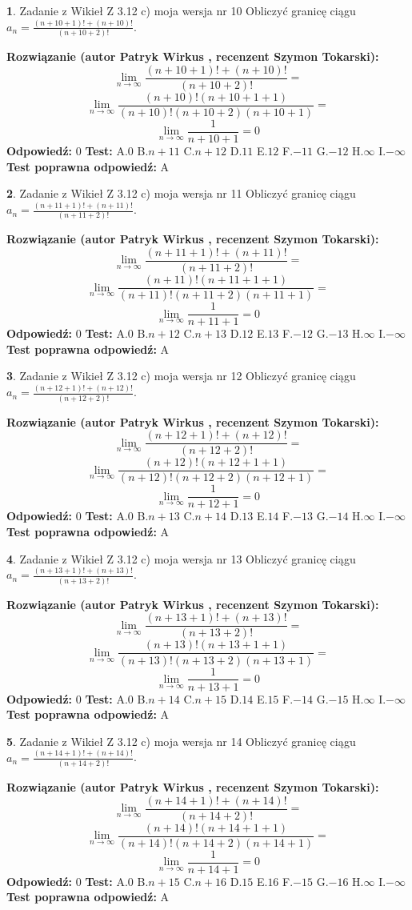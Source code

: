 \documentclass[12pt, a4paper]{article}
\theoremstyle{definition} %
\newtheorem{zad}{}
\newcommand{\zadStart}[1]{\begin{zad}#1\newline}
\newcommand{\zadStop}{\end{zad}}
\newcommand{\rozwStart}[2]{\noindent \textbf{Rozwiązanie (autor #1 , recenzent #2): }\newline}
\newcommand{\rozwStop}{\newline}
\newcommand{\odpStart}{\noindent \textbf{Odpowiedź:}\newline}
\newcommand{\odpStop}{\newline}
\newcommand{\testStart}{\noindent \textbf{Test:}\newline}
\newcommand{\testStop}{\newline}
\newcommand{\kluczStart}{\noindent \textbf{Test poprawna odpowiedź:}\newline}
\newcommand{\kluczStop}{\newline}
\begin{document}
\zadStart{Zadanie z Wikieł Z 3.12 c) moja wersja nr 10}
Obliczyć granicę ciągu $a_{n}=\frac{(n+10+1)!+(n+10)!}{(n+10+2)!}$.
\zadStop
\rozwStart{Patryk Wirkus}{Szymon Tokarski}
$$\lim\limits_{n\to\infty}\frac{(n+10+1)!+(n+10)!}{(n+10+2)!}=$$
$$\lim\limits_{n\to\infty}\frac{(n+10)!(n+10+1+1)}{(n+10)!(n+10+2)(n+10+1)}=$$
$$\lim\limits_{n\to\infty}\frac{1}{n+10+1}= 0$$
\rozwStop
\odpStart
$0$
\odpStop
\testStart
A.$0$
B.$n+11$
C.$n+12$
D.$11$
E.$12$
F.$-11$
G.$-12$
H.$\infty$
I.$-\infty$
\testStop
\kluczStart
A
\kluczStop



\zadStart{Zadanie z Wikieł Z 3.12 c) moja wersja nr 11}
Obliczyć granicę ciągu $a_{n}=\frac{(n+11+1)!+(n+11)!}{(n+11+2)!}$.
\zadStop
\rozwStart{Patryk Wirkus}{Szymon Tokarski}
$$\lim\limits_{n\to\infty}\frac{(n+11+1)!+(n+11)!}{(n+11+2)!}=$$
$$\lim\limits_{n\to\infty}\frac{(n+11)!(n+11+1+1)}{(n+11)!(n+11+2)(n+11+1)}=$$
$$\lim\limits_{n\to\infty}\frac{1}{n+11+1}= 0$$
\rozwStop
\odpStart
$0$
\odpStop
\testStart
A.$0$
B.$n+12$
C.$n+13$
D.$12$
E.$13$
F.$-12$
G.$-13$
H.$\infty$
I.$-\infty$
\testStop
\kluczStart
A
\kluczStop



\zadStart{Zadanie z Wikieł Z 3.12 c) moja wersja nr 12}
Obliczyć granicę ciągu $a_{n}=\frac{(n+12+1)!+(n+12)!}{(n+12+2)!}$.
\zadStop
\rozwStart{Patryk Wirkus}{Szymon Tokarski}
$$\lim\limits_{n\to\infty}\frac{(n+12+1)!+(n+12)!}{(n+12+2)!}=$$
$$\lim\limits_{n\to\infty}\frac{(n+12)!(n+12+1+1)}{(n+12)!(n+12+2)(n+12+1)}=$$
$$\lim\limits_{n\to\infty}\frac{1}{n+12+1}= 0$$
\rozwStop
\odpStart
$0$
\odpStop
\testStart
A.$0$
B.$n+13$
C.$n+14$
D.$13$
E.$14$
F.$-13$
G.$-14$
H.$\infty$
I.$-\infty$
\testStop
\kluczStart
A
\kluczStop



\zadStart{Zadanie z Wikieł Z 3.12 c) moja wersja nr 13}
Obliczyć granicę ciągu $a_{n}=\frac{(n+13+1)!+(n+13)!}{(n+13+2)!}$.
\zadStop
\rozwStart{Patryk Wirkus}{Szymon Tokarski}
$$\lim\limits_{n\to\infty}\frac{(n+13+1)!+(n+13)!}{(n+13+2)!}=$$
$$\lim\limits_{n\to\infty}\frac{(n+13)!(n+13+1+1)}{(n+13)!(n+13+2)(n+13+1)}=$$
$$\lim\limits_{n\to\infty}\frac{1}{n+13+1}= 0$$
\rozwStop
\odpStart
$0$
\odpStop
\testStart
A.$0$
B.$n+14$
C.$n+15$
D.$14$
E.$15$
F.$-14$
G.$-15$
H.$\infty$
I.$-\infty$
\testStop
\kluczStart
A
\kluczStop



\zadStart{Zadanie z Wikieł Z 3.12 c) moja wersja nr 14}
Obliczyć granicę ciągu $a_{n}=\frac{(n+14+1)!+(n+14)!}{(n+14+2)!}$.
\zadStop
\rozwStart{Patryk Wirkus}{Szymon Tokarski}
$$\lim\limits_{n\to\infty}\frac{(n+14+1)!+(n+14)!}{(n+14+2)!}=$$
$$\lim\limits_{n\to\infty}\frac{(n+14)!(n+14+1+1)}{(n+14)!(n+14+2)(n+14+1)}=$$
$$\lim\limits_{n\to\infty}\frac{1}{n+14+1}= 0$$
\rozwStop
\odpStart
$0$
\odpStop
\testStart
A.$0$
B.$n+15$
C.$n+16$
D.$15$
E.$16$
F.$-15$
G.$-16$
H.$\infty$
I.$-\infty$
\testStop
\kluczStart
A
\kluczStop
\end{document}
